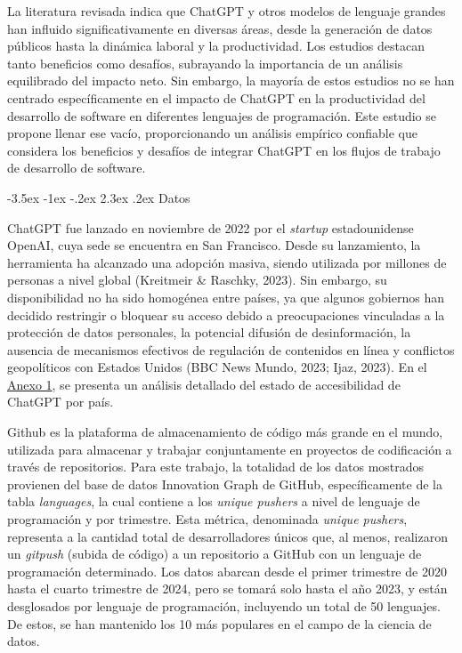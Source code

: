 \documentclass[12pt,a4paper]{article}
\makeatletter
\renewcommand\section{\@startsection{section}{1}{\z@}%
  {-3.5ex \@plus -1ex \@minus -.2ex}%
  {2.3ex \@plus.2ex}%
  {\normalfont\normalsize}}
\makeatother
\begin{document}
La literatura revisada indica que ChatGPT y otros modelos de lenguaje grandes han influido significativamente en diversas áreas, desde la generación de datos públicos hasta la dinámica laboral y la productividad. Los estudios destacan tanto beneficios como desafíos, subrayando la importancia de un análisis equilibrado del impacto neto. Sin embargo, la mayoría de estos estudios no se han centrado específicamente en el impacto de ChatGPT en la productividad del desarrollo de software en diferentes lenguajes de programación. Este estudio se propone llenar ese vacío, proporcionando un análisis empírico confiable que considera los beneficios y desafíos de integrar ChatGPT en los flujos de trabajo de desarrollo de software.


\clearpage
\section{Datos}

ChatGPT fue lanzado en noviembre de 2022 por el \textit{startup} estadounidense OpenAI, cuya sede se encuentra en San Francisco. Desde su lanzamiento, la herramienta ha alcanzado una adopción masiva, siendo utilizada por millones de personas a nivel global (Kreitmeir \& Raschky, 2023). Sin embargo, su disponibilidad no ha sido homogénea entre países, ya que algunos gobiernos han decidido restringir o bloquear su acceso debido a preocupaciones vinculadas a la protección de datos personales, la potencial difusión de desinformación, la ausencia de mecanismos efectivos de regulación de contenidos en línea y conflictos geopolíticos con Estados Unidos (BBC News Mundo, 2023; Ijaz, 2023). En el \hyperref[anexo:1]{Anexo 1}, se presenta un análisis detallado del estado de accesibilidad de ChatGPT por país.

Github es la plataforma de almacenamiento de código más grande en el mundo, utilizada para almacenar y trabajar conjuntamente en proyectos de codificación a través de repositorios. Para este trabajo, la totalidad de los datos mostrados provienen del base de datos Innovation Graph de GitHub, específicamente de la tabla \textit{languages}, la cual contiene a los \textit{unique pushers} a nivel de lenguaje de programación y por trimestre. Esta métrica, denominada \textit{unique pushers}, representa a la cantidad total de desarrolladores únicos que, al menos, realizaron un \textit{git}\textit{push} (subida de código) a un repositorio a GitHub con un lenguaje de programación determinado. Los datos abarcan desde el primer trimestre de 2020 hasta el cuarto trimestre de 2024, pero se tomará solo hasta el año 2023, y están desglosados por lenguaje de programación, incluyendo un total de 50 lenguajes. De estos, se han mantenido los 10 más populares en el campo de la ciencia de datos.
\end{document}
